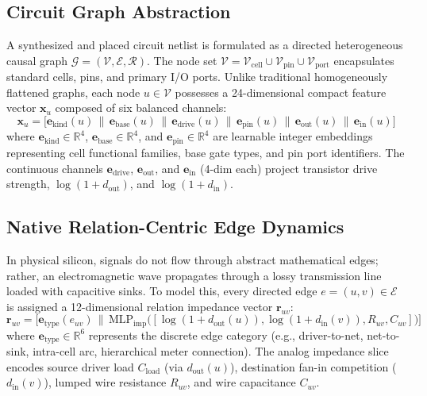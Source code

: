 \documentclass[conference]{IEEEtran}
\begin{document}
\subsection{Circuit Graph Abstraction}
A synthesized and placed circuit netlist is formulated as a directed heterogeneous causal graph $\mathcal{G} = (\mathcal{V}, \mathcal{E}, \mathcal{R})$. The node set $\mathcal{V} = \mathcal{V}_{\text{cell}} \cup \mathcal{V}_{\text{pin}} \cup \mathcal{V}_{\text{port}}$ encapsulates standard cells, pins, and primary I/O ports. Unlike traditional homogeneously flattened graphs, each node $u \in \mathcal{V}$ possesses a 24-dimensional compact feature vector $\mathbf{x}_u$ composed of six balanced channels:
\begin{equation}
\mathbf{x}_u = \big[ \mathbf{e}_{\text{kind}}(u) \,\|\, \mathbf{e}_{\text{base}}(u) \,\|\, \mathbf{e}_{\text{drive}}(u) \,\|\, \mathbf{e}_{\text{pin}}(u) \,\|\, \mathbf{e}_{\text{out}}(u) \,\|\, \mathbf{e}_{\text{in}}(u) \big]
\end{equation}
where $\mathbf{e}_{\text{kind}} \in \mathbb{R}^4$, $\mathbf{e}_{\text{base}} \in \mathbb{R}^4$, and $\mathbf{e}_{\text{pin}} \in \mathbb{R}^4$ are learnable integer embeddings representing cell functional families, base gate types, and pin port identifiers. The continuous channels $\mathbf{e}_{\text{drive}}$, $\mathbf{e}_{\text{out}}$, and $\mathbf{e}_{\text{in}}$ (4-dim each) project transistor drive strength, $\log(1 + d_{\text{out}})$, and $\log(1 + d_{\text{in}})$.

\subsection{Native Relation-Centric Edge Dynamics}
In physical silicon, signals do not flow through abstract mathematical edges; rather, an electromagnetic wave propagates through a lossy transmission line loaded with capacitive sinks. To model this, every directed edge $e = (u, v) \in \mathcal{E}$ is assigned a 12-dimensional relation impedance vector $\mathbf{r}_{uv}$:
\begin{equation}
\mathbf{r}_{uv} = \big[ \mathbf{e}_{\text{type}}(e_{uv}) \,\|\, \text{MLP}_{\text{imp}}\big( [\log(1 + d_{\text{out}}(u)), \log(1 + d_{\text{in}}(v)), R_{uv}, C_{uv}] \big) \big]
\end{equation}
where $\mathbf{e}_{\text{type}} \in \mathbb{R}^6$ represents the discrete edge category (e.g., driver-to-net, net-to-sink, intra-cell arc, hierarchical meter connection). The analog impedance slice encodes source driver load $C_{\text{load}}$ (via $d_{\text{out}}(u)$), destination fan-in competition ($d_{\text{in}}(v)$), lumped wire resistance $R_{uv}$, and wire capacitance $C_{uv}$.
\end{document}
